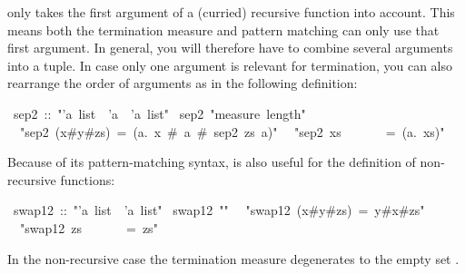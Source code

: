 \begin{isabelle}
\begin{isamarkuptext}
\begin{warn}
   only takes the first argument of a (curried)
  recursive function into account. This means both the termination measure
  and pattern matching can only use that first argument. In general, you will
  therefore have to combine several arguments into a tuple. In case only one
  argument is relevant for termination, you can also rearrange the order of
  arguments as in the following definition:
\end{warn}%
\end{isamarkuptext}%
~sep2~::~{"}'a~list~{\isasymRightarrow}~'a~{\isasymRightarrow}~'a~list{"}\isanewline
{}~sep2~{"}measure~length{"}\isanewline
~~{"}sep2~(x\#y\#zs)~=~({\isasymlambda}a.~x~\#~a~\#~sep2~zs~a){"}\isanewline
~~{"}sep2~xs~~~~~~~=~({\isasymlambda}a.~xs){"}%
\begin{isamarkuptext}%
Because of its pattern-matching syntax,  is also useful
for the definition of non-recursive functions:%
\end{isamarkuptext}%
~swap12~::~{"}'a~list~{\isasymRightarrow}~'a~list{"}\isanewline
{}~swap12~{"}{\isabraceleft}{\isabraceright}{"}\isanewline
~~{"}swap12~(x\#y\#zs)~=~y\#x\#zs{"}\isanewline
~~{"}swap12~zs~~~~~~~=~zs{"}%
\begin{isamarkuptext}%
\noindent
In the non-recursive case the termination measure degenerates to the empty
set \isa{\{\}}.%
\end{isamarkuptext}%
\end{isabelle}%
